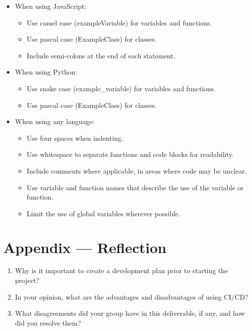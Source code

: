 \documentclass{article}
\begin{document}
\begin{itemize}
  \item When using JavaScript:
  \begin{itemize}
    \item Use camel case (exampleVariable) for variables and functions.
    \item Use pascal case (ExampleClass) for classes.
    \item Include semi-colons at the end of each statement.
  \end{itemize}
  \item When using Python:
  \begin{itemize}
    \item Use snake case (example\_variable) for variables and functions.
    \item Use pascal case (ExampleClass) for classes.
  \end{itemize}
  \item When using any language:
  \begin{itemize}
    \item Use four spaces when indenting.
    \item Use whitespace to separate functions and code blocks for readability.
    \item Include comments where applicable, in areas where code may be unclear.
    \item Use variable and function names that describe the use of the variable
    or function.
    \item Limit the use of global variables wherever possible.
  \end{itemize}
\end{itemize}


\newpage{}

\section*{Appendix --- Reflection}




\begin{enumerate}
    \item Why is it important to create a development plan prior to starting the
    project?
    \item In your opinion, what are the advantages and disadvantages of using
    CI/CD?
    \item What disagreements did your group have in this deliverable, if any,
    and how did you resolve them?
\end{enumerate}
\end{document}
